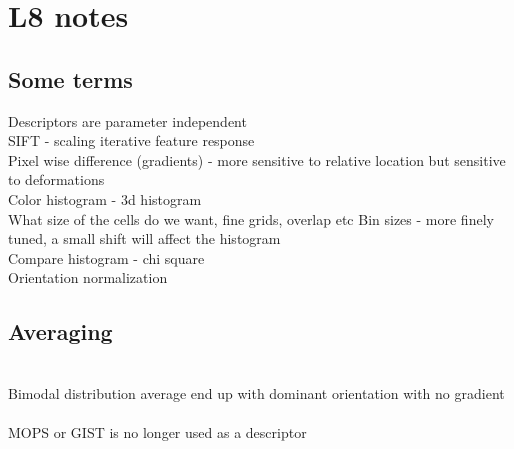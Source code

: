 \documentclass[11pt]{article}
\begin{document}
\section*{L8 notes}
\subsection*{Some terms}
Descriptors are parameter independent\\
SIFT - scaling iterative feature response\\
Pixel wise difference (gradients) - more sensitive to relative location but sensitive to deformations
\\
Color histogram - 3d histogram \\
What size of the cells do we want, fine grids, overlap etc
Bin sizes - more finely tuned, a small shift will affect the histogram
\\
Compare histogram - chi square
\\
Orientation normalization\\
\subsection*{Averaging}\\
Bimodal distribution average end up with dominant orientation with no gradient\\\\
MOPS or GIST is no longer used as a descriptor\\
\\\\
\end{document}
